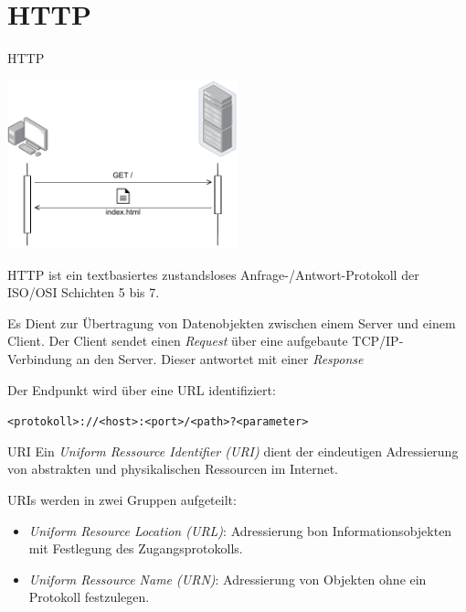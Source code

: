 \section{HTTP}

\begin{defi}{HTTP}
    \begin{center}
        \includegraphics[width=0.5\textwidth]{includes/figures/defi_http.pdf}
    \end{center}

    HTTP ist ein textbasiertes zustandsloses Anfrage-/Antwort-Protokoll der ISO/OSI Schichten 5 bis 7.

    Es Dient zur Übertragung von Datenobjekten zwischen einem Server und einem Client.
    Der Client sendet einen \emph{Request} über eine aufgebaute TCP/IP-Verbindung an den Server.
    Dieser antwortet mit einer \emph{Response}

    Der Endpunkt wird über eine URL identifiziert:

    \texttt{<protokoll>://<host>:<port>/<path>?<parameter>}
\end{defi}

\begin{defi}{URI}
    Ein \emph{Uniform Ressource Identifier (URI)} dient der eindeutigen Adressierung von abstrakten und physikalischen Ressourcen im Internet.

    URIs werden in zwei Gruppen aufgeteilt:
    \begin{itemize}
        \item \emph{Uniform Resource Location (URL)}: Adressierung bon Informationsobjekten mit Festlegung des Zugangsprotokolls.
        \item \emph{Uniform Ressource Name (URN)}: Adressierung von Objekten ohne ein Protokoll festzulegen.
    \end{itemize}
\end{defi}

